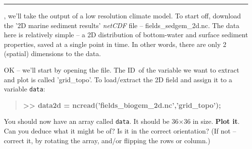 \documentclass{tufte-book} %
\newenvironment{docspecbold}{\begin{quotation}\ttfamily\bfseries\parskip0pt\parindent0pt\ignorespaces}{\end{quotation}}
\begin{document}
\vspace{-1mm}
\noindent\rule{4cm}{0.5pt}
\vspace{-2mm}

, we'll take the output of a low resolution climate model. To start off, download the '2D marine sediment results' \textit{netCDF} file -- \textsf{fields\_sedgem\_2d.nc}. The data here is relatively simple -- a 2D distribution of bottom-water and surface sediment properties, saved at a single point in time. In other words, there are only 2 (spatial) dimensions to the data.

OK -- we'll start by opening the file. The ID\ of the variable we want to extract and plot  is called \textsf{'grid\_topo'}. To load/extract the 2D field and assign it to a variable \texttt{data}:

\begin{docspecbold}
>> data2d = ncread('fields\_biogem\_2d.nc','grid\_topo');
\end{docspecbold}

You should now have an array called \texttt{data}. It should be 36\(\times\)36 in size. \textbf{Plot it}. Can you deduce what it might be of? Is it in the correct orientation? (If not -- correct it, by rotating the array, and/or flipping the rows or column.)
\end{document}
